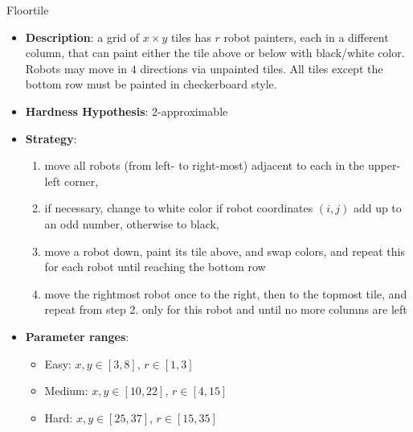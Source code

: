 \documentclass[aspectratio=169,xcolor=dvipsnames]{beamer}
\begin{document}
\begin{frame}{Floortile}
    \begin{itemize}
        \item \textbf{Description}: a grid of $x\times y$ tiles has $r$ robot painters, each in a different column, that can paint either the tile above or below with black/white color. Robots may move in $4$ directions via unpainted tiles. All tiles except the bottom row must be painted in checkerboard style.
        \item \textbf{Hardness Hypothesis}: $2$-approximable  %
        \item \textbf{Strategy}:
        \begin{enumerate}
            \item move all robots (from left- to right-most) adjacent to each in the upper-left corner,
            \item if necessary, change to white color if robot coordinates $(i,j)$ add up to an odd number, otherwise to black,
            \item move a robot down, paint its tile above, and swap colors, and repeat this for each robot until reaching the bottom row
            \item move the rightmost robot once to the right, then to the topmost tile, and repeat from step 2. only for this robot and until no more columns are left
        \end{enumerate}
        \item \textbf{Parameter ranges}:
        \begin{itemize}
            \item Easy: $x,y \in [3,8]$, $r \in [1,3]$
            \item Medium: $x,y \in [10,22]$, $r \in [4,15]$
            \item Hard: $x,y \in [25,37]$, $r \in [15,35]$
        \end{itemize}
    \end{itemize}
\end{frame}
\end{document}
